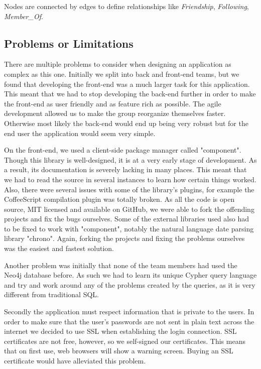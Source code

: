 \documentclass[11pt]{article}
\begin{document}
Nodes are connected by edges to define relationships like \textit{Friendship}, \textit{Following}, \textit{Member\_Of}.

\subsection{Problems or Limitations}

There are multiple problems to consider when designing an application as complex as this one.
Initially we split into back and front-end teams, but we found that developing the front-end was a much larger task for this application. This meant that we had to stop developing the back-end further in order to make the front-end as user friendly and as feature rich as possible.
The agile development allowed us to make the group reorganize themselves faster. Otherwise most likely the back-end would end up being very robust but for the end user the application would seem very simple.

On the front-end, we used a client-side package manager called "component". Though this library is well-designed, it is at a very early stage of development. As a result, its documentation is severely lacking in many places. This meant that we had to read the source in several instances to learn how certain things worked. Also, there were several issues with some of the library's plugins, for example the CoffeeScript compilation plugin was totally broken. As all the code is open source, MIT licensed and available on GitHub, we were able to fork the offending projects and fix the bugs ourselves. Some of the external libraries used also had to be fixed to work with "component", notably the natural language date parsing library "chrono". Again, forking the projects and fixing the problems ourselves was the easiest and fastest solution.

Another problem was initially that none of the team members had used the Neo4j database before. As such we had to learn its unique Cypher query language and try and work around any of the problems created by the queries, as it is very different from traditional SQL.

Secondly the application must respect information that is private to the users. In order to make sure that the user's passwords are not sent in plain text across the internet we decided to use SSL when establishing the login connection. SSL certificates are not free, however, so we self-signed our certificates. This means that on first use, web browsers will show a warning screen. Buying an SSL certificate would have alleviated this problem.
\end{document}
